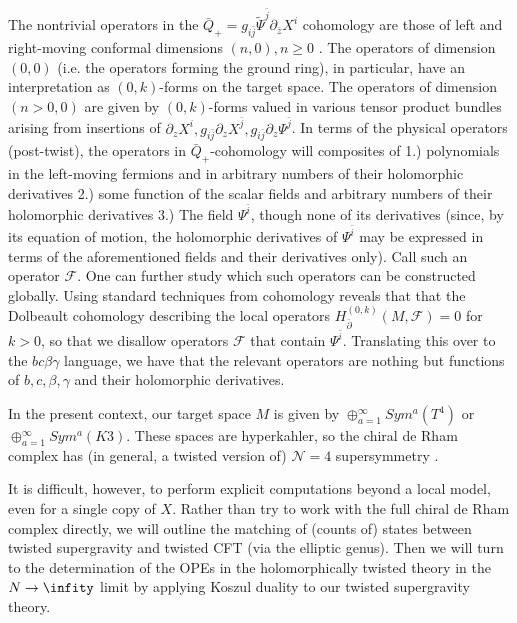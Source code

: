 \documentclass[../main.tex]{subfiles}
\begin{document}
The nontrivial operators in the $\bar{Q}_+ = g_{i \bar{j}}\tilde{\Psi}^{\bar{j}} \partial_{\bar{z}}X^i$ cohomology are those of left and right-moving conformal dimensions $(n, 0), n \geq 0$ \cite{Tan,CostelloHol,ESW}. 
The operators of dimension $(0, 0)$ (i.e. the operators forming the ground ring), in particular, have an interpretation as $(0,k)$-forms on the target space. 
The operators of dimension $(n > 0, 0)$ are given by $(0, k)$-forms valued in various tensor product bundles arising from insertions of $\partial_z X^i, g_{i \bar{j}}\partial_z X^{\bar{j}}, g_{i \bar{j}}\partial_z \Psi^{\bar{j}}$. In terms of the physical operators (post-twist), the operators in $\bar{Q}_+$-cohomology will composites of 1.) polynomials in the left-moving fermions and in arbitrary numbers of their holomorphic derivatives 2.) some function of the scalar fields and arbitrary numbers of their holomorphic derivatives 3.) The field $\Psi^{\bar{i}}$, though none of its derivatives (since, by its equation of motion, the holomorphic derivatives of $\Psi^{\bar{i}}$ may be expressed in terms of the aforementioned fields and their derivatives only). Call such an operator $\mathcal{F}$. One can further study which such operators can be constructed globally. Using standard techniques from cohomology reveals that that the Dolbeault cohomology describing the local operators $H_{\bar{\partial}}^{(0,k)}(M, \mathcal{F})=0$ for $k>0$, so that we disallow operators $\mathcal{F}$ that contain $\Psi^{\bar{i}}$. Translating this over to the $bc\beta\gamma$ language, we have that the relevant operators are nothing but functions of $b, c, \beta, \gamma$ and their holomorphic derivatives.

In the present context, our target space $M$ is given by $\oplus_{a=1}^{\infty} Sym^a (T^4)$ or $\oplus_{a=1}^{\infty} Sym^a(K3)$. These spaces are hyperkahler, so the chiral de Rham complex has  (in general, a twisted version of) $\mathcal{N}=4$ supersymmetry \cite{Heluanietal}.

It is difficult, however, to perform explicit computations beyond a local model, even for a single copy of $X$. Rather than try to work with the full chiral de Rham complex directly, we will outline the matching of (counts of) states between twisted supergravity and twisted CFT (via the elliptic genus). Then we will turn to the determination of the OPEs in the holomorphically twisted theory in the $N \rightarrow \infity$ limit by applying Koszul duality to our twisted supergravity theory. 
\end{document}
